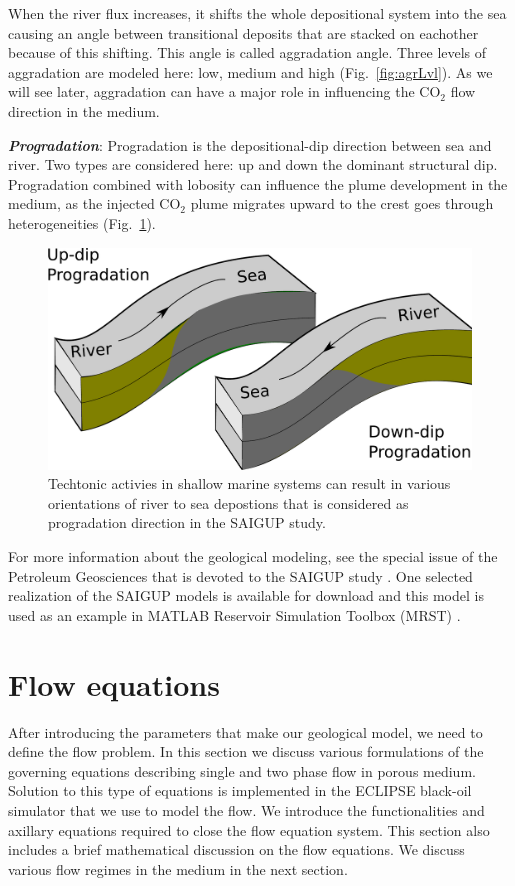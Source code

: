 When the river flux increases, it shifts the whole depositional system into the
sea causing an  angle between transitional deposits that are stacked on
eachother because of this shifting. This angle is called aggradation angle.
Three levels of aggradation are modeled here: low, medium and
high (Fig.~\ref{fig:agrLvl}). As we will see later, aggradation can have a major
role in influencing the $\mbox{CO}_2$ flow direction in the medium. 

\textbf{\textit{Progradation}}: 
Progradation is the depositional-dip direction between sea and river.
Two types are considered here: up and down the dominant structural dip.
Progradation combined with lobosity can influence the plume development in the
medium, as the injected $\mbox{CO}_2$ plume migrates upward to the crest goes
through heterogeneities (Fig.~\ref{fig:proLvl}). 


\begin{figure}[thb]
  \centering
  \includegraphics[width=0.65 \linewidth]{./figurer/progradation} 
  \caption{Techtonic activies in shallow marine systems can result in various orientations of river to sea depostions that is considered as progradation direction in the SAIGUP study.}
  \label{fig:proLvl}
%
\end{figure}

\vspace{1cm}
For more information about the geological modeling, see the special issue of the Petroleum Geosciences that is devoted to the SAIGUP study \cite{matthews2008assessing}. One selected realization of the SAIGUP models is available for download \cite{saigupModel} and this model is used as an example in MATLAB Reservoir Simulation Toolbox (MRST) \cite{mrstSaigup}. 

\section{Flow equations}
\label{sec:FlowEquations}
After introducing the parameters that make our geological model, we need to
define the flow problem. In this section we discuss various formulations of the governing equations describing single and two phase flow in porous medium. Solution to this type of equations is implemented in the ECLIPSE black-oil simulator that we use to model the flow. We introduce the functionalities and axillary equations required to close the flow equation system. This section also includes a brief mathematical discussion on the flow equations. We discuss various flow regimes in the medium in the next section.

